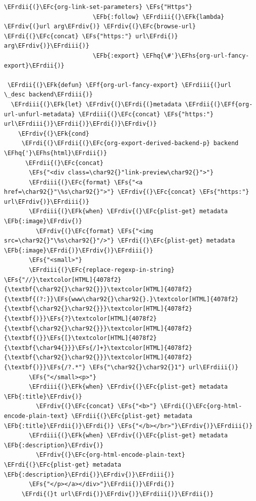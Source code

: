 \documentclass{scrartcl}
\newcommand{\EFk}[1]{\textcolor{EFk}{#1}} %
\newcommand{\EFs}[1]{\textcolor{EFs}{#1}} %
\newcommand{\EFb}[1]{\textcolor{EFb}{#1}} %
\newcommand{\EFc}[1]{\textcolor{EFc}{#1}} %
\newcommand{\EFf}[1]{\textcolor{EFf}{#1}} %
\newcommand{\EFhq}[1]{\textcolor{EFhq}{#1}} %
\newcommand{\EFhs}[1]{\textcolor{EFhs}{#1}} %
\newcommand{\EFrdi}[1]{\textcolor{EFrdi}{#1}} %
\newcommand{\EFrdii}[1]{\textcolor{EFrdii}{#1}} %
\newcommand{\EFrdiii}[1]{\textcolor{EFrdiii}{#1}} %
\newcommand{\EFrdiv}[1]{\textcolor{EFrdiv}{#1}} %
\begin{document}
\begin{Code}
\begin{Verbatim}[]
\EFrdii{(}\EFc{org-link-set-parameters} \EFs{"Https"}
                         \EFb{:follow} \EFrdiii{(}\EFk{lambda} \EFrdiv{(}url arg\EFrdiv{)} \EFrdiv{(}\EFc{browse-url} \EFrdi{(}\EFc{concat} \EFs{"https:"} url\EFrdi{)} arg\EFrdiv{)}\EFrdiii{)}
                         \EFb{:export} \EFhq{\#'}\EFhs{org-url-fancy-export}\EFrdii{)}

 \EFrdii{(}\EFk{defun} \EFf{org-url-fancy-export} \EFrdiii{(}url \_desc backend\EFrdiii{)}
  \EFrdiii{(}\EFk{let} \EFrdiv{(}\EFrdi{(}metadata \EFrdii{(}\EFf{org-url-unfurl-metadata} \EFrdiii{(}\EFc{concat} \EFs{"https:"} url\EFrdiii{)}\EFrdii{)}\EFrdi{)}\EFrdiv{)}
    \EFrdiv{(}\EFk{cond}
     \EFrdi{(}\EFrdii{(}\EFc{org-export-derived-backend-p} backend \EFhq{'}\EFhs{html}\EFrdii{)}
      \EFrdii{(}\EFc{concat}
       \EFs{"<div class=\char92{}"link-preview\char92{}">"}
       \EFrdiii{(}\EFc{format} \EFs{"<a href=\char92{}"\%s\char92{}">"} \EFrdiv{(}\EFc{concat} \EFs{"https:"} url\EFrdiv{)}\EFrdiii{)}
       \EFrdiii{(}\EFk{when} \EFrdiv{(}\EFc{plist-get} metadata \EFb{:image}\EFrdiv{)}
         \EFrdiv{(}\EFc{format} \EFs{"<img src=\char92{}"\%s\char92{}"/>"} \EFrdi{(}\EFc{plist-get} metadata \EFb{:image}\EFrdi{)}\EFrdiv{)}\EFrdiii{)}
       \EFs{"<small>"}
       \EFrdiii{(}\EFc{replace-regexp-in-string} \EFs{"//}\textcolor[HTML]{4078f2}{\textbf{\char92{}\char92{}}}\textcolor[HTML]{4078f2}{\textbf{(?:}}\EFs{www\char92{}\char92{}.}\textcolor[HTML]{4078f2}{\textbf{\char92{}\char92{}}}\textcolor[HTML]{4078f2}{\textbf{)}}\EFs{?}\textcolor[HTML]{4078f2}{\textbf{\char92{}\char92{}}}\textcolor[HTML]{4078f2}{\textbf{(}}\EFs{[}\textcolor[HTML]{4078f2}{\textbf{\char94{}}}\EFs{/]+}\textcolor[HTML]{4078f2}{\textbf{\char92{}\char92{}}}\textcolor[HTML]{4078f2}{\textbf{)}}\EFs{/?.*"} \EFs{"\char92{}\char92{}1"} url\EFrdiii{)}
       \EFs{"</small><p>"}
       \EFrdiii{(}\EFk{when} \EFrdiv{(}\EFc{plist-get} metadata \EFb{:title}\EFrdiv{)}
         \EFrdiv{(}\EFc{concat} \EFs{"<b>"} \EFrdi{(}\EFc{org-html-encode-plain-text} \EFrdii{(}\EFc{plist-get} metadata \EFb{:title}\EFrdii{)}\EFrdi{)} \EFs{"</b></br>"}\EFrdiv{)}\EFrdiii{)}
       \EFrdiii{(}\EFk{when} \EFrdiv{(}\EFc{plist-get} metadata \EFb{:description}\EFrdiv{)}
         \EFrdiv{(}\EFc{org-html-encode-plain-text} \EFrdi{(}\EFc{plist-get} metadata \EFb{:description}\EFrdi{)}\EFrdiv{)}\EFrdiii{)}
       \EFs{"</p></a></div>"}\EFrdii{)}\EFrdi{)}
     \EFrdi{(}t url\EFrdi{)}\EFrdiv{)}\EFrdiii{)}\EFrdii{)}


\end{Verbatim}
\end{Code}
\end{document}
